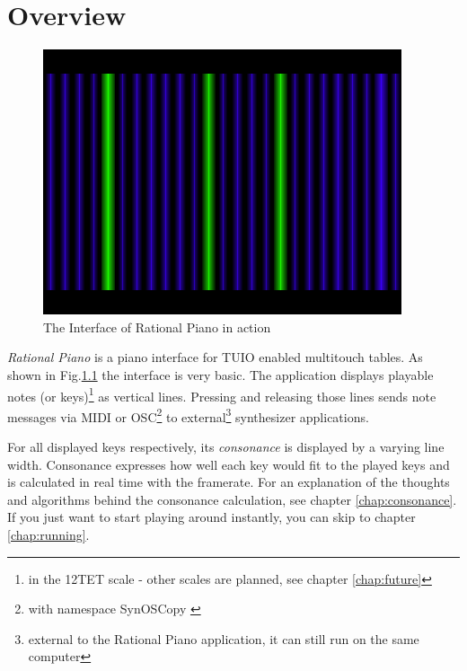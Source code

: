 \documentclass[12pt,a4paper,titlepage,oneside]{report}
\begin{document}
\maketitle

\tableofcontents
\newpage
\listoffigures
\newpage
\listoftables
\newpage


\chapter{Overview}
\label{chap:overview}

\begin{figure}[!ht]
\includegraphics[width=\textwidth]{images/interface_active.png}
\centering
\caption{The Interface of Rational Piano in action}
\label{fig:interface_active}
\end{figure}

\textit{Rational Piano} is a piano interface for TUIO \cite{bib:tuio} enabled multitouch tables. As shown in Fig.\ref{fig:interface_active} the interface is very basic. The application displays playable notes (or keys)\footnote{in the 12TET scale - other scales are planned, see chapter \ref{chap:future}} as vertical lines. Pressing and releasing those lines sends note messages via MIDI \cite{bib:midi} or OSC\footnote{with namespace SynOSCopy \cite{bib:synoscopyNamespace}} \cite{bib:osc} to external\footnote{external to the Rational Piano application, it can still run on the same computer} synthesizer applications. 

For all displayed keys respectively, its \textit{consonance} \cite{bib:consonance} is displayed by a varying line width. Consonance expresses how well each key would fit to the played keys and is calculated in real time with the framerate. For an explanation of the thoughts and algorithms behind the consonance calculation, see chapter \ref{chap:consonance}. If you just want to start playing around instantly, you can skip to chapter \ref{chap:running}.
\end{document}
